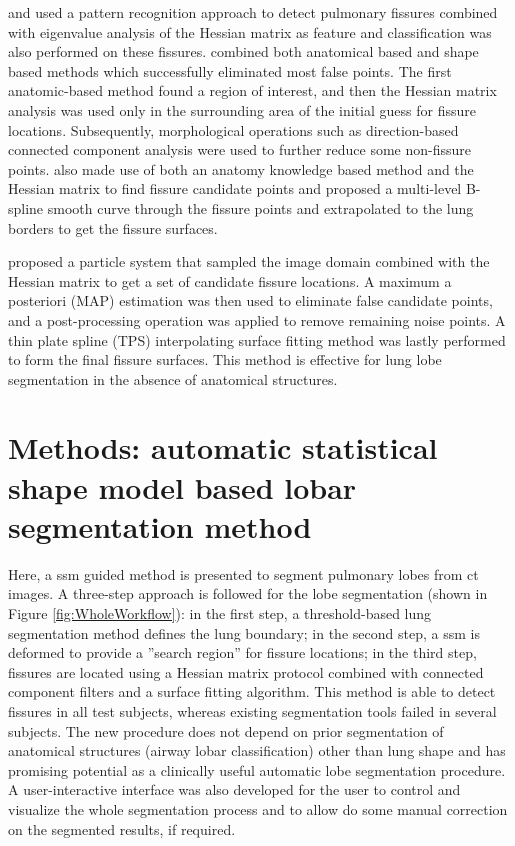 \cite{ochs2007automated} and \cite{van2008supervised} used a pattern recognition approach to detect pulmonary fissures combined with eigenvalue analysis of the Hessian matrix as feature and classification was also performed on these fissures. \cite{lassen2011interactive,lassen2013automatic} combined both anatomical based and shape based methods which successfully eliminated most false points. The first anatomic-based method found a region of interest, and then the Hessian matrix analysis was used only in the surrounding area of the initial guess for fissure locations. Subsequently, morphological operations such as direction-based connected component analysis were used to further reduce some non-fissure points. \cite{doel2012pulmonary} also made use of both an anatomy knowledge based method and the Hessian matrix to find fissure candidate points and proposed a multi-level B-spline smooth curve through the fissure points and extrapolated to the lung borders to get the fissure surfaces.

\cite{ross2010automatic, ross2013pulmonary} proposed a particle system that sampled the image domain combined with the Hessian matrix to get a set of candidate fissure locations. A maximum a posteriori (MAP) estimation was then used to eliminate false candidate points, and a post-processing operation was applied to remove remaining noise points. A thin plate spline (TPS) interpolating surface fitting method was lastly performed to form the final fissure surfaces. This method is effective for lung lobe segmentation in the absence of anatomical structures.

\section{Methods: automatic statistical shape model based lobar segmentation method} \label{SegmentationMethod}
Here, a \gls{ssm} guided method is presented to segment pulmonary lobes from \gls{ct} images. A three-step approach is followed for the lobe segmentation (shown in Figure \ref{fig:WholeWorkflow}): in the first step, a threshold-based lung segmentation method defines the lung boundary; in the second step, a \gls{ssm} is deformed to provide a ''search region'' for fissure locations; in the third step, fissures are located using a Hessian matrix protocol combined with connected component filters and a surface fitting algorithm. This method is able to detect fissures in all test subjects, whereas existing segmentation tools failed in several subjects. The new procedure does not depend on prior segmentation of anatomical structures (airway lobar classification) other than lung shape and has promising potential as a clinically useful automatic lobe segmentation procedure. A user-interactive interface was also developed for the user to control and visualize the whole segmentation process and to allow do some manual correction on the segmented results, if required.
\newpage

